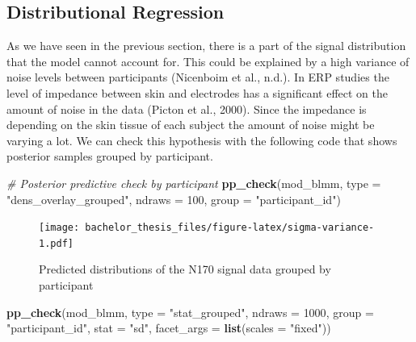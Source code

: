 \documentclass[
  doc,12pt,floatsintext]{apa7}
\newenvironment{Shaded}{\begin{snugshade}}{\end{snugshade}}
\newcommand{\AttributeTok}[1]{\textcolor[rgb]{0.13,0.29,0.53}{#1}}
\newcommand{\CommentTok}[1]{\textcolor[rgb]{0.56,0.35,0.01}{\textit{#1}}}
\newcommand{\DecValTok}[1]{\textcolor[rgb]{0.00,0.00,0.81}{#1}}
\newcommand{\FunctionTok}[1]{\textcolor[rgb]{0.13,0.29,0.53}{\textbf{#1}}}
\newcommand{\NormalTok}[1]{#1}
\newcommand{\StringTok}[1]{\textcolor[rgb]{0.31,0.60,0.02}{#1}}
\begin{document}
\subsection{Distributional Regression}\label{distributional-regression}

As we have seen in the previous section, there is a part of the signal distribution that the model cannot account for. This could be explained by a high variance of noise levels between participants (Nicenboim et al., n.d.). In ERP studies the level of impedance between skin and electrodes has a significant effect on the amount of noise in the data (Picton et al., 2000). Since the impedance is depending on the skin tissue of each subject the amount of noise might be varying a lot. We can check this hypothesis with the following code that shows posterior samples grouped by participant.



\begin{Shaded}
\begin{Highlighting}[]
\CommentTok{\# Posterior predictive check by participant}
\FunctionTok{pp\_check}\NormalTok{(mod\_blmm, }
         \AttributeTok{type =} \StringTok{"dens\_overlay\_grouped"}\NormalTok{,}
         \AttributeTok{ndraws =} \DecValTok{100}\NormalTok{,}
         \AttributeTok{group =} \StringTok{"participant\_id"}\NormalTok{)}
\end{Highlighting}
\end{Shaded}

\begin{figure}
\centering
\texttt{[image: bachelor\_thesis\_files/figure-latex/sigma-variance-1.pdf]}
\caption{\label{fig:sigma-variance}Predicted distributions of the N170 signal data grouped by participant}
\end{figure}



\begin{Shaded}
\begin{Highlighting}[]
\FunctionTok{pp\_check}\NormalTok{(mod\_blmm,}
         \AttributeTok{type =} \StringTok{"stat\_grouped"}\NormalTok{,}
         \AttributeTok{ndraws =} \DecValTok{1000}\NormalTok{,}
         \AttributeTok{group =} \StringTok{"participant\_id"}\NormalTok{,}
         \AttributeTok{stat =} \StringTok{"sd"}\NormalTok{,}
         \AttributeTok{facet\_args =} \FunctionTok{list}\NormalTok{(}\AttributeTok{scales =} \StringTok{"fixed"}\NormalTok{))}
\end{Highlighting}
\end{Shaded}
\end{document}
